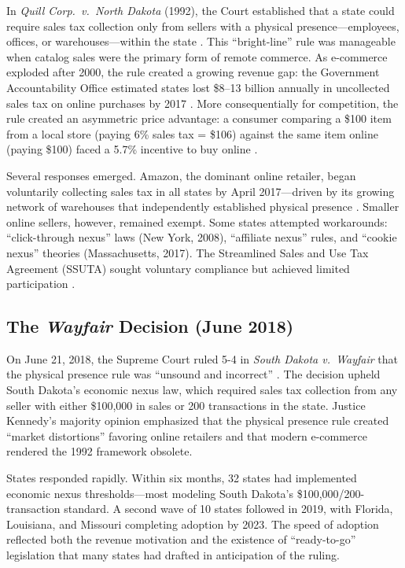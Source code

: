 \documentclass[12pt]{article}
\begin{document}
In \textit{Quill Corp.\ v.\ North Dakota} (1992), the Court established that a state could require sales tax collection only from sellers with a physical presence---employees, offices, or warehouses---within the state \citep{quill1992}. This ``bright-line'' rule was manageable when catalog sales were the primary form of remote commerce. As e-commerce exploded after 2000, the rule created a growing revenue gap: the Government Accountability Office estimated states lost \$8--13 billion annually in uncollected sales tax on online purchases by 2017 \citep{gao2017}. More consequentially for competition, the rule created an asymmetric price advantage: a consumer comparing a \$100 item from a local store (paying 6\% sales tax = \$106) against the same item online (paying \$100) faced a 5.7\% incentive to buy online \citep{einav2014}.

Several responses emerged. Amazon, the dominant online retailer, began voluntarily collecting sales tax in all states by April 2017---driven by its growing network of warehouses that independently established physical presence \citep{houde2023}. Smaller online sellers, however, remained exempt. Some states attempted workarounds: ``click-through nexus'' laws (New York, 2008), ``affiliate nexus'' rules, and ``cookie nexus'' theories (Massachusetts, 2017). The Streamlined Sales and Use Tax Agreement (SSUTA) sought voluntary compliance but achieved limited participation \citep{bruce2009}.

\subsection{The \textit{Wayfair} Decision (June 2018)}

On June 21, 2018, the Supreme Court ruled 5-4 in \textit{South Dakota v.\ Wayfair} that the physical presence rule was ``unsound and incorrect'' \citep{wayfair2018}. The decision upheld South Dakota's economic nexus law, which required sales tax collection from any seller with either \$100,000 in sales or 200 transactions in the state. Justice Kennedy's majority opinion emphasized that the physical presence rule created ``market distortions'' favoring online retailers and that modern e-commerce rendered the 1992 framework obsolete.

States responded rapidly. Within six months, 32 states had implemented economic nexus thresholds---most modeling South Dakota's \$100,000/200-transaction standard. A second wave of 10 states followed in 2019, with Florida, Louisiana, and Missouri completing adoption by 2023. The speed of adoption reflected both the revenue motivation and the existence of ``ready-to-go'' legislation that many states had drafted in anticipation of the ruling.
\end{document}
